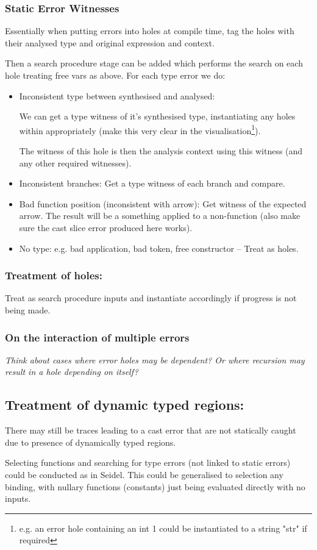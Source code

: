 \subsubsection{Static Error Witnesses}
Essentially when putting errors into holes at compile time, tag the holes with their analysed type and original expression and context.\par 
Then a search procedure stage can be added which performs the search on each hole treating free vars as above. For each type error we do:
\begin{itemize}
\item Inconsistent type between synthesised and analysed:\par  We can get a type witness of it's synthesised type, instantiating any holes within appropriately (make this very clear in the visualisation\footnote{e.g. an error hole containing an int 1 could be instantiated to a string "str" if required}).\par 
The witness of this hole is then the analysis context using this witness (and any other required witnesses).
\item Inconsistent branches: Get a type witness of each branch and compare.
\item Bad function position (inconsistent with arrow): Get witness of the expected arrow. The result will be a something applied to a non-function (also make sure the cast slice error produced here works).
\item No type: e.g. bad application, bad token, free constructor -- Treat as holes.
\end{itemize}

\subsubsection{Treatment of holes:}
Treat as search procedure inputs and instantiate accordingly if progress is not being made.

\subsubsection{On the interaction of multiple errors}
\textit{Think about cases where error holes may be dependent? Or where recursion may result in a hole depending on itself?}

\subsection{Treatment of dynamic typed regions:}
There may still be traces leading to a cast error that are not statically caught due to presence of dynamically typed regions.\par 
Selecting functions and searching for type errors (not linked to static errors) could be conducted as in Seidel. This could be generalised to selection any binding, with nullary functions (constants) just being evaluated directly with no inputs.

